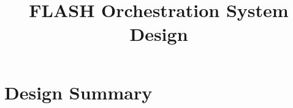 \documentclass{article}
\title{FLASH Orchestration System Design}
\begin{document}
\theoremstyle{definition} %
\newtheorem{req}{Req}[section]

\maketitle

\section{Design Summary}
%
%
\end{document}

